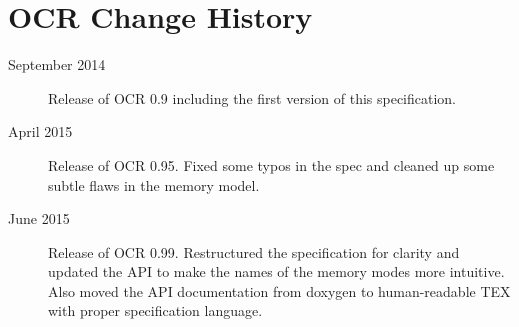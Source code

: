%

\chapter{OCR Change  History}
\label{chap:OCR Change History}
\label{chap:Appendix D}
\begin{description}
\item[September 2014] Release of OCR 0.9 including the first version
  of this specification.
\item[April 2015] Release of OCR 0.95.  Fixed some typos in the spec and 
cleaned up some subtle flaws in the memory model.
\item[June 2015] Release of OCR 0.99. Restructured the specification for clarity and
updated the API to make the names of the memory modes more intuitive.  Also moved 
the API documentation from doxygen to human-readable TEX with proper specification
language. 
\end{description}

